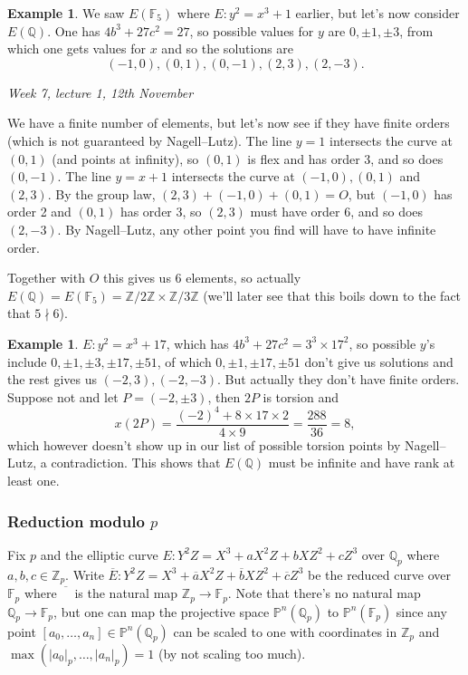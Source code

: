 \documentclass{article}
\newcommand{\F}{\mathbb{F}}
\newcommand{\Z}{\mathbb{Z}}
\newcommand{\Q}{\mathbb{Q}}
\newcommand{\p}{\mathbb{P}}
\theoremstyle{definition}
\newtheorem{example}[defn]{Example}
\begin{document}
\begin{example}
We saw $E(\F_5)$ where $E:y^2=x^3+1$ earlier, but let's now consider $E(\Q)$. One has $4b^3+27c^2=27$, so possible values for $y$ are $0,\pm 1,\pm 3$, from which one gets values for $x$ and so the solutions are
\[
(-1,0),(0,1),(0,-1),(2,3),(2,-3).
\]

\begin{flushright}
\textit{Week 7, lecture 1, 12th November}
\end{flushright}

We have a finite number of elements, but let's now see if they have finite orders (which is not guaranteed by Nagell--Lutz). The line $y=1$ intersects the curve at $(0,1)$ (and points at infinity), so $(0,1)$ is flex and has order 3, and so does $(0,-1)$. The line $y=x+1$ intersects the curve at $(-1,0),(0,1)$ and $(2,3)$. By the group law, $(2,3)+(-1,0)+(0,1)=O$, but $(-1,0)$ has order 2 and $(0,1)$ has order 3, so $(2,3)$ must have order 6, and so does $(2,-3)$. By Nagell--Lutz, any other point you find will have to have infinite order.

Together with $O$ this gives us 6 elements, so actually $E(\Q)=E(\F_5)=\Z/2\Z\times\Z/3\Z$ (we'll later see that this boils down to the fact that $5\nmid 6$).
\end{example}

\begin{example}
$E:y^2=x^3+17$, which has $4b^3+27c^2=3^3\times 17^2$, so possible $y$'s include $0,\pm 1,\pm 3,\pm 17,\pm 51$, of which $0,\pm 1,\pm 17,\pm 51$ don't give us solutions and the rest gives us $(-2,3),(-2,-3)$. But actually they don't have finite orders. Suppose not and let $P=(-2,\pm 3)$, then $2P$ is torsion and
\[
x(2P)=\frac{(-2)^4+8\times 17\times 2}{4\times 9}=\frac{288}{36}=8,
\]
which however doesn't show up in our list of possible torsion points by Nagell--Lutz, a contradiction. This shows that $E(\Q)$ must be infinite and have rank at least one.
\end{example}

\subsubsection{Reduction modulo $p$}
Fix $p$ and the elliptic curve $E:Y^2Z=X^3+aX^2Z+bXZ^2+cZ^3$ over $\Q_p$ where $a,b,c\in\Z_p$. Write $\overline E:Y^2Z=X^3+\overline aX^2Z+\overline bXZ^2+\overline cZ^3$ be the reduced curve over $\F_p$ where $\overline{\phantom{E}}$ is the natural map $\Z_p\rightarrow\F_p$. Note that there's no natural map $\Q_p\rightarrow\F_p$, but one can map the projective space $\p^n(\Q_p)$ to $\p^n(\F_p)$ since any point $[a_0,\ldots,a_n]\in\p^n(\Q_p)$ can be scaled to one with coordinates in $\Z_p$ and $\max(|a_0|_p,\ldots,|a_n|_p)=1$ (by not scaling too much).
\end{document}
